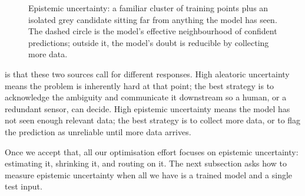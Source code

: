 \begin{figure}
\centering
{}
\caption{Epistemic uncertainty: a familiar cluster of training points plus an isolated grey candidate sitting far from anything the model has seen. The dashed circle is the model's effective neighbourhood of confident predictions; outside it, the model's doubt is reducible by collecting more data.}
\label{fig:epistemic_sparse}
\end{figure}


 is that these two sources call for different responses.
High aleatoric uncertainty means the problem is inherently hard at that point; the best strategy is to acknowledge the ambiguity and communicate it downstream so a human, or a redundant sensor, can decide.
High epistemic uncertainty means the model has not seen enough relevant data; the best strategy is to collect more data, or to flag the prediction as unreliable until more data arrives.

Once we accept that, all our optimisation effort focuses on epistemic uncertainty: estimating it, shrinking it, and routing on it.
The next subsection asks how to measure epistemic uncertainty when all we have is a trained model and a single test input.


